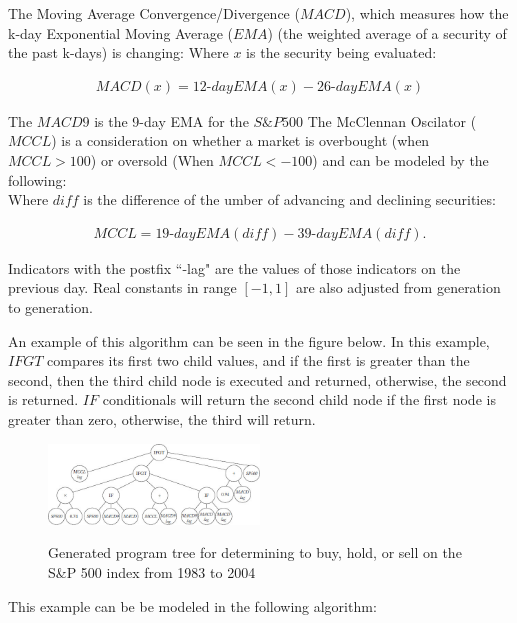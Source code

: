 \documentclass{article}
\renewcommand{\_}{\ifincsname_\else\legacyunderscore\fi}
\begin{document}
The Moving Average Convergence/Divergence (\textbf{$MACD$}), which measures how the k-day Exponential Moving Average ($EMA$) (the weighted average of a security of the past k-days) is changing:
Where $x$ is the security being evaluated:

\begin{equation}
    \begin{aligned}
     MACD(x) = 12\text{-}day EMA(x) - 26\text{-}day EMA(x)
     \end{aligned}
\end{equation}

The \textbf{$MACD9$} is the 9-day EMA for the $S\&P500$
The McClennan Oscilator ($MCCL$) is a consideration on whether a market is overbought (when $MCCL > 100$) or oversold (When $MCCL < -100$) and can be modeled by the following:\\
Where $diff$ is the difference of the  umber of advancing and declining securities:

\begin{equation}
    \begin{aligned}
    MCCL = 19\text{-}day EMA(diff) - 39\text{-}day EMA(diff).
    \end{aligned}
\end{equation}

Indicators with the postfix ``-lag" are the values of those indicators on the previous day. Real constants in range $[-1, 1]$ are also adjusted from generation to generation.

An example of this algorithm can be seen in the figure below. In this example, $IFGT$ compares its first two child values, and if the first is greater than the second, then the third child node is executed and returned, otherwise, the second is returned. $IF$ conditionals will return the second child node if the first node is greater than zero, otherwise, the third will return.
\begin{figure}[!h]
    \centering
    \includegraphics[width=0.5\textwidth,keepaspectratio]{gen_alg_tree.jpg}
    \label{fig:space_partition}
    \caption{Generated program tree for determining to buy, hold, or sell on the S\&P 500 index from 1983 to 2004}
\end{figure}
\newpage
This example can be be modeled in the following algorithm:
\end{document}
